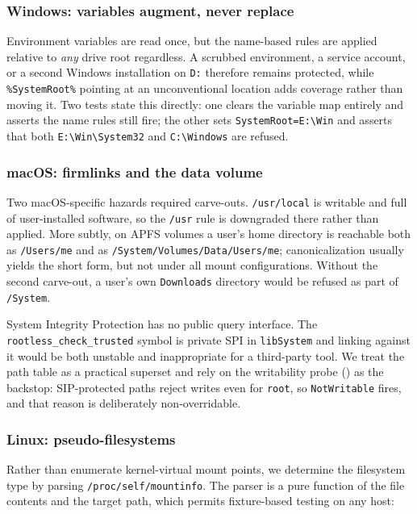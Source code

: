 \documentclass[11pt,a4paper]{article}
\newcommand{\code}[1]{\texttt{\small #1}}
\begin{document}
\subsubsection{Windows: variables augment, never replace}

Environment variables are read once, but the name-based rules are applied relative to
\emph{any} drive root regardless. A scrubbed environment, a service account, or a
second Windows installation on \code{D:} therefore remains protected, while
\code{\%SystemRoot\%} pointing at an unconventional location adds coverage rather than
moving it. Two tests state this directly: one clears the variable map entirely and
asserts the name rules still fire; the other sets \code{SystemRoot=E:\textbackslash Win} and asserts
that both \code{E:\textbackslash Win\textbackslash System32} and \code{C:\textbackslash Windows} are refused.

\subsubsection{macOS: firmlinks and the data volume}

Two macOS-specific hazards required carve-outs. \code{/usr/local} is writable and
full of user-installed software, so the \code{/usr} rule is downgraded there rather
than applied. More subtly, on APFS volumes a user's home directory is reachable both
as \code{/Users/me} and as \code{/System/Volumes/Data/Users/me}; canonicalization
usually yields the short form, but not under all mount configurations. Without the
second carve-out, a user's own \code{Downloads} directory would be refused as part of
\code{/System}.

System Integrity Protection has no public query interface. The
\code{rootless\_check\_trusted} symbol is private SPI in \code{libSystem} and linking
against it would be both unstable and inappropriate for a third-party tool. We treat
the path table as a practical superset and rely on the writability probe
() as the backstop: SIP-protected paths reject writes even for
\code{root}, so \code{NotWritable} fires, and that reason is deliberately
non-overridable.

\subsubsection{Linux: pseudo-filesystems}

Rather than enumerate kernel-virtual mount points, we determine the filesystem type
by parsing \code{/proc/self/mountinfo}. The parser is a pure function of the file
contents and the target path, which permits fixture-based testing on any host:
\end{document}
